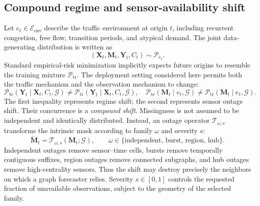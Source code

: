 \documentclass[pdflatex,sn-mathphys-num]{sn-jnl}
\begin{document}
\subsection{Compound regime and sensor-availability shift}
Let $e_t\in\mathcal{E}_{\mathrm{env}}$ describe the traffic environment at
origin $t$, including recurrent congestion, free flow, transition periods, and
atypical demand. The joint data-generating distribution is written as
\begin{equation}
 (\mathbf{X}_t,\mathbf{M}_t,\mathbf{Y}_t,C_t)\sim
 \mathcal{P}_{e_t}.
\end{equation}
Standard empirical-risk minimization implicitly expects future origins to
resemble the training mixture $\mathcal{P}_{\mathrm{tr}}$. The deployment
setting considered here permits both the traffic mechanism and the observation
mechanism to change:
\begin{equation}
 \mathcal{P}_{\mathrm{te}}(\mathbf{Y}_t\mid\mathbf{X}_t,C_t,\mathcal{G})
 \ne \mathcal{P}_{\mathrm{tr}}(\mathbf{Y}_t\mid\mathbf{X}_t,C_t,\mathcal{G}),
 \quad
 \mathcal{P}_{\mathrm{te}}(\mathbf{M}_t\mid e_t,\mathcal{G})
 \ne \mathcal{P}_{\mathrm{tr}}(\mathbf{M}_t\mid e_t,\mathcal{G}).
 \label{eq:compound-shift}
\end{equation}
The first inequality represents regime shift; the second represents sensor
outage shift. Their concurrence is a \emph{compound shift}. Missingness is not
assumed to be independent and identically distributed. Instead, an outage
operator $\mathcal{T}_{\omega,s}$ transforms the intrinsic mask according to
family $\omega$ and severity $s$:
\begin{equation}
 \widetilde{\mathbf{M}}_t=
 \mathcal{T}_{\omega,s}(\mathbf{M}_t;\mathcal{G}),
 \qquad
 \omega\in\{\text{independent, burst, region, hub}\}.
 \label{eq:outage-operator}
\end{equation}
Independent outages remove sensor--time cells, bursts remove temporally
contiguous suffixes, region outages remove connected subgraphs, and hub outages
remove high-centrality sensors. Thus the shift may destroy precisely the
neighbors on which a graph forecaster relies. Severity $s\in[0,1]$ controls the
requested fraction of unavailable observations, subject to the geometry of the
selected family.
\end{document}
